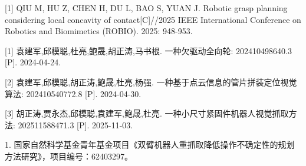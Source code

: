 \begin{publications}



[1] QIU M, HU Z, CHEN H, DU L, BAO S, YUAN J. Robotic grasp planning considering local concavity of contact[C]//2025 IEEE International Conference on Robotics and Biomimetics
(ROBIO). 2025: 948-953.


[1] 袁建军,邱模聪,杜亮,鲍晟,胡正涛,马书根. 一种欠驱动全向轮: 202410498640.3 [P]. 2024-04-24.

[2] 袁建军,邱模聪,胡正涛,鲍晟,杜亮,杨强. 一种基于点云信息的管片拼装定位视觉算法: 202410540772.8 [P]. 2024-04-30.

[3] 胡正涛,贾永杰,邱模聪,袁建军,鲍晟,杜亮. 一种小尺寸紧固件机器人视觉抓取方法: 202511588471.3 [P]. 2025-11-03.



1. 国家自然科学基金青年基金项目《双臂机器人重抓取降低操作不确定性的规划方法研究》，项目编号：62403297。


\end{publications}
